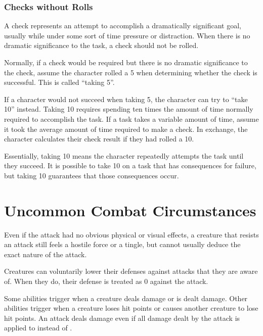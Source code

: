     \subsubsection{Checks without Rolls}
      A check represents an attempt to accomplish a dramatically significant goal, usually while under some sort of time pressure or distraction.
      When there is no dramatic significance to the task, a check should not be rolled.

      Normally, if a check would be required but there is no dramatic significance to the check, assume the character rolled a 5 when determining whether the check is successful.
      This is called ``taking 5''.

      If a character would not succeed when taking 5, the character can try to ``take 10'' instead.
      Taking 10 requires spending ten times the amount of time normally required to accomplish the task.
      If a task takes a variable amount of time, assume it took the average amount of time required to make a check.
      In exchange, the character calculates their check result if they had rolled a 10.

      Essentially, taking 10 means the character repeatedly attempts the task until they succeed.
      It is possible to take 10 on a task that has consequences for failure, but taking 10 guarantees that those consequences occur.

\section{Uncommon Combat Circumstances}

  Even if the attack had no obvious physical or visual effects, a creature that resists an attack still feels a hostile force or a tingle, but cannot usually deduce the exact nature of the attack.

  Creatures can voluntarily lower their defenses against attacks that they are aware of.
  When they do, their defense is treated as 0 against the attack.

  Some abilities trigger when a creature deals damage or is dealt damage.
  Other abilities trigger when a creature loses hit points or causes another creature to lose hit points.
  An attack deals damage even if all damage dealt by the attack is applied to  instead of .

